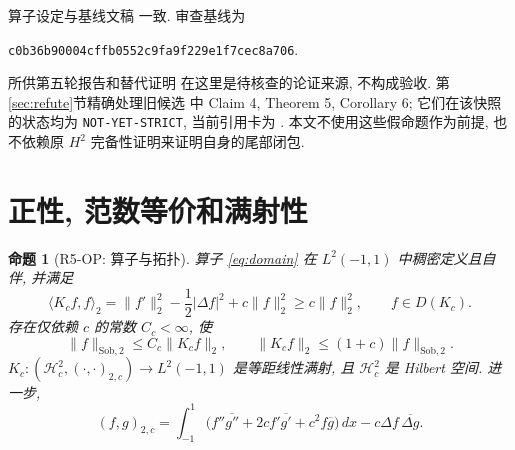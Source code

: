 \documentclass[UTF8,fontset=fandol,11pt,a4paper]{ctexart}
\newtheorem{proposition}[theorem]{命题}
\theoremstyle{definition}
\newcommand{\Hc}{\mathcal H_c^2}
\newcommand{\LL}{L^2(-1,1)}
\newcommand{\ip}[2]{\langle #1,#2\rangle_2}
\newcommand{\norm}[1]{\lVert #1\rVert}
\begin{document}
算子设定与基线文稿 \cite[第1节, 第2.2--2.3节]{priorh2} 一致.
审查基线为
\begin{center}\small\texttt{c0b36b90004cffb0552c9fa9f229e1f7cec8a706}.\end{center}
所供第五轮报告和替代证明 \cite{audit,appendix} 在这里是待核查的论证来源,
不构成验收. 第\ref{sec:refute}节精确处理旧候选 \cite{oldrun} 中
Claim 4, Theorem 5, Corollary 6; 它们在该快照的状态均为
\texttt{NOT-YET-STRICT}, 当前引用卡为 \cite{card}.
本文不使用这些假命题作为前提, 也不依赖原 $H^2$ 完备性证明来证明自身的尾部闭包.

\section{正性, 范数等价和满射性}
\label{sec:operator}

\begin{proposition}[R5-OP: 算子与拓扑]\label{prop:operator}
算子 \eqref{eq:domain} 在 $\LL$ 中稠密定义且自伴, 并满足
\begin{equation}\label{eq:energy}
\ip{K_cf}{f}=\norm{f'}_2^2-\frac12|\Delta f|^2+c\norm{f}_2^2
\ge c\norm{f}_2^2,\qquad f\in D(K_c).
\end{equation}
存在仅依赖 $c$ 的常数 $C_c<\infty$, 使
\begin{equation}\label{eq:normequi}
\norm{f}_{\mathrm{Sob},2}\le C_c\norm{K_cf}_2,
\qquad
\norm{K_cf}_2\le(1+c)\norm{f}_{\mathrm{Sob},2}.
\end{equation}
$K_c:(\Hc,(\cdot,\cdot)_{2,c})\longrightarrow\LL$ 是等距线性满射,
且 $\Hc$ 是 Hilbert 空间. 进一步,
\begin{equation}\label{eq:ldinner}
(f,g)_{2,c}=\int_{-1}^1
\bigl(f''\overline{g''}+2cf'\overline{g'}+c^2f\overline g\bigr)\,dx
-c\Delta f\,\overline{\Delta g}.
\end{equation}
\end{proposition}
\end{document}
